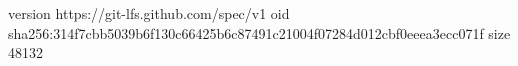 version https://git-lfs.github.com/spec/v1
oid sha256:314f7cbb5039b6f130c66425b6c87491c21004f07284d012cbf0eeea3ecc071f
size 48132

